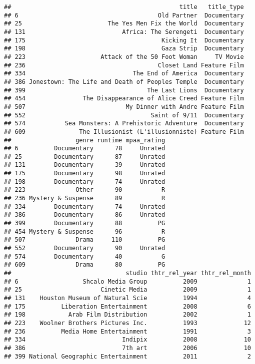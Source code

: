 \documentclass[]{article}
\begin{document}
\begin{verbatim}
##                                               title   title_type
## 6                                       Old Partner  Documentary
## 25                        The Yes Men Fix the World  Documentary
## 131                           Africa: The Serengeti  Documentary
## 175                                      Kicking It  Documentary
## 198                                      Gaza Strip  Documentary
## 223                     Attack of the 50 Foot Woman     TV Movie
## 236                                     Closet Land Feature Film
## 334                              The End of America  Documentary
## 386 Jonestown: The Life and Death of Peoples Temple  Documentary
## 399                                  The Last Lions  Documentary
## 454                The Disappearance of Alice Creed Feature Film
## 507                            My Dinner with Andre Feature Film
## 552                                   Saint of 9/11  Documentary
## 574           Sea Monsters: A Prehistoric Adventure  Documentary
## 609               The Illusionist (L'illusionniste) Feature Film
##                  genre runtime mpaa_rating
## 6          Documentary      78     Unrated
## 25         Documentary      87     Unrated
## 131        Documentary      39     Unrated
## 175        Documentary      98     Unrated
## 198        Documentary      74     Unrated
## 223              Other      90           R
## 236 Mystery & Suspense      89           R
## 334        Documentary      74     Unrated
## 386        Documentary      86     Unrated
## 399        Documentary      88          PG
## 454 Mystery & Suspense      96           R
## 507              Drama     110          PG
## 552        Documentary      90     Unrated
## 574        Documentary      40           G
## 609              Drama      80          PG
##                                studio thtr_rel_year thtr_rel_month
## 6                  Shcalo Media Group          2009              1
## 25                      Cinetic Media          2009              1
## 131    Houston Museum of Natural Scie          1994              4
## 175          Liberation Entertainment          2008              6
## 198            Arab Film Distribution          2002              1
## 223    Woolner Brothers Pictures Inc.          1993             12
## 236          Media Home Entertainment          1991              3
## 334                           Indipix          2008             10
## 386                           7th art          2006             10
## 399 National Geographic Entertainment          2011              2

\end{verbatim}
\end{document}
